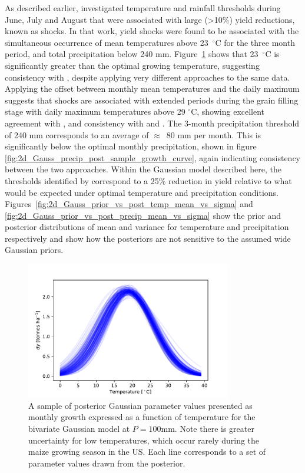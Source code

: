 \documentclass[12pt]{iopart}
\newcommand{\add}[1]{#1}
\begin{document}
As described earlier, \cite{kent:2017} investigated temperature and rainfall thresholds during June, July and August that were associated with large (>10\%) yield reductions, known as shocks. In that work, yield shocks were found to be associated with the simultaneous occurrence of mean temperatures above 23~$^\circ$C for the three month period, and total precipitation below 240 mm. Figure~\ref{fig:2d_Gauss_temp_post_sample_growth_curve} shows that 23~$^\circ$C is significantly greater than the optimal growing temperature, suggesting consistency with \cite{kent:2017}, despite applying very different approaches to the same data. Applying the offset between monthly mean temperatures and the daily maximum suggests that shocks are associated with extended periods during the grain filling stage with daily maximum temperatures above 29 $^\circ$C, showing excellent agreement with \cite{schlenker:2009}, and consistency with \cite{sanchez:2014} and \cite{hatfield:2015}. The 3-month precipitation threshold of 240 mm corresponds to an average of $\approx$~80 mm per month. This is significantly below the optimal monthly precipitation, shown in figure \ref{fig:2d_Gauss_precip_post_sample_growth_curve}, again indicating consistency between the two approaches. \add{Within the Gaussian model described here, the thresholds identified by \cite{kent:2017} correspond to a 25\% reduction in yield relative to what would be expected under optimal temperature and precipitation conditions.} Figures~\ref{fig:2d_Gauss_prior_vs_post_temp_mean_vs_sigma} and 
\ref{fig:2d_Gauss_prior_vs_post_precip_mean_vs_sigma} show the prior and posterior distributions of mean and variance for temperature and precipitation respectively and show how the posteriors are not sensitive to the assumed wide Gaussian priors.

\begin{figure}
\centering
\includegraphics[width=0.8\textwidth]{./figures/2d_Gauss_temp_post_sample_growth_curve}
\caption{\label{fig:2d_Gauss_temp_post_sample_growth_curve} A sample of posterior Gaussian parameter values presented as monthly growth expressed as a function of temperature for the bivariate Gaussian model at $P = 100$mm. Note there is greater uncertainty for low temperatures, which occur rarely during the maize growing season in the US. Each line corresponds to a set of parameter values drawn from the posterior.}
\end{figure}
\end{document}
